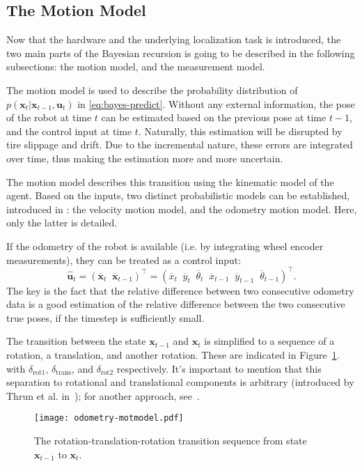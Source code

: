 \subsection{The Motion Model}\label{subsec:mot-model}
Now that the hardware and the underlying localization task is introduced, the two main parts of the
Bayesian recursion is going to be described in the following subsections: the motion model, and the measurement model.

The motion model is used to describe the probability distribution of
$p(\mathbf{x}_t | \mathbf{x}_{t-1},\mathbf{u}_t)$ in \eqref{eq:bayes-predict}. \linebreak
Without any external information, the pose of the robot at time $t$ can be estimated based on the previous pose
at time $t-1$, and the control input at time $t$. Naturally, this estimation will be disrupted by tire slippage and drift.
Due to the incremental nature, these errors are integrated over time, thus making the estimation more and more
uncertain.

The motion model describes this transition using the kinematic model of the agent.
Based on the inputs, two distinct probabilistic models can be established, introduced in \cite{Thrun2005}: the velocity motion model,
and the odometry motion model. Here, only the latter is detailed.

If the odometry of the robot is available (i.e. by integrating wheel encoder measurements),
they can be treated as a control input:
\begin{equation}\label{eq:odom-raw-input}
    \hat{\mathbf{u}}_t = (\overline{\mathbf{x}}_t\;\;\overline{\mathbf{x}}_{t-1})^\top =
    \left(\overline{x}_t\;\;\overline{y}_t\;\;\overline{\theta}_t\;\;\overline{x}_{t-1}\;\;\overline{y}_{t-1}\;\;\overline{\theta}_{t-1}\right)^\top.
\end{equation}
The key is the fact that the relative difference between
two consecutive odometry data is a good estimation of the relative difference between
the two consecutive true poses, if the timestep is sufficiently small.

The transition between the state $\mathbf{x}_{t-1}$ and $\mathbf{x}_{t}$ is simplified to a sequence of a rotation, a translation,
and another rotation.
These are indicated in Figure~\ref{fig:odom-mot-model}. with $\delta_{\mathrm{rot1}}$, $\delta_{\mathrm{trans}}$,
and $\delta_{\mathrm{rot2}}$ respectively.
It's important to mention that this separation to rotational and translational components is arbitrary
(introduced by Thrun et al. in~\cite{Thrun2005}); for another approach, see~\cite{Eliazar2004}.
\begin{figure}[htbp]
    \centering
    \texttt{[image: odometry-motmodel.pdf]}
    \caption{The rotation-translation-rotation transition sequence from state $\mathbf{x}_{t-1}$ to $\mathbf{x}_{t}$.}
    \label{fig:odom-mot-model}
\end{figure}

